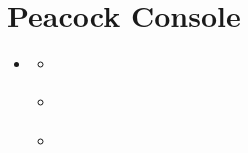\documentclass[a4paper,11pt,openany,oneside,english]{sphinxmanual}
\begin{document}
\section{Peacock Console}
\label{\detokenize{modules/console/readme:peacock-console}}\label{\detokenize{modules/console/readme::doc}}
\begin{sphinxShadowBox}
\begin{itemize}
\item {} 
\label{\detokenize{modules/console/readme:id1}}{\hyperref[\detokenize{modules/console/readme:peacock-console}]{}}
\begin{itemize}
\item {} 
\label{\detokenize{modules/console/readme:id2}}{\hyperref[\detokenize{modules/console/readme:tabcompletion}]{}}

\item {} 
\label{\detokenize{modules/console/readme:id3}}{\hyperref[\detokenize{modules/console/readme:shortcuts}]{}}

\item {} 
\label{\detokenize{modules/console/readme:id4}}{\hyperref[\detokenize{modules/console/readme:peacock-commands}]{}}

\end{itemize}

\end{itemize}
\end{sphinxShadowBox}
\end{document}
